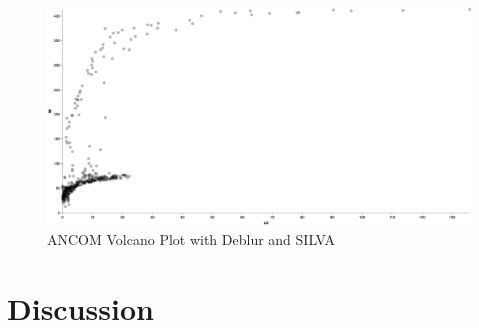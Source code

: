 \documentclass[a4paper]{article}
\begin{document}
            \begin{figure}[p]
                \centering
                \includegraphics[width=0.8 \linewidth]{figures/ANCOM/Deblur.silva.png}
                \caption{ANCOM Volcano Plot with Deblur and SILVA}
                \label{fig:volcano-deblur-silva}
            \end{figure}

    \section{Discussion}

    
    
\end{document}
